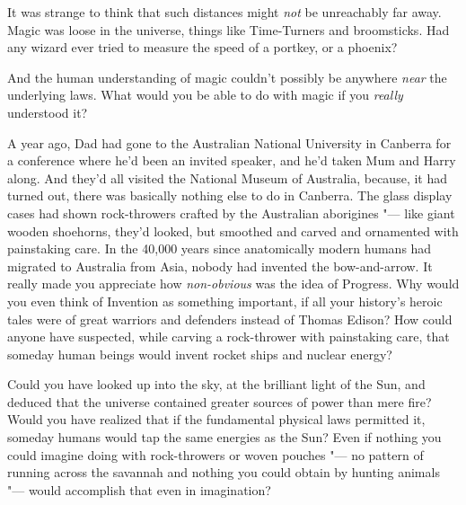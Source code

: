 It was strange to think that such distances might \emph{not} be
unreachably far away. Magic was loose in the universe, things like
Time-Turners and broomsticks. Had any wizard ever tried to measure the
speed of a portkey, or a phoenix?

And the human understanding of magic couldn't possibly be anywhere
\emph{near} the underlying laws. What would you be able to do with magic
if you \emph{really} understood it?

A year ago, Dad had gone to the Australian National University in
Canberra for a conference where he'd been an invited speaker, and he'd
taken Mum and Harry along. And they'd all visited the National Museum of
Australia, because, it had turned out, there was basically nothing else
to do in Canberra. The glass display cases had shown rock-throwers
crafted by the Australian aborigines "--- like giant wooden shoehorns,
they'd looked, but smoothed and carved and ornamented with painstaking
care. In the 40,000 years since anatomically modern humans had migrated
to Australia from Asia, nobody had invented the bow-and-arrow. It really
made you appreciate how \emph{non-obvious} was the idea of Progress. Why
would you even think of Invention as something important, if all your
history's heroic tales were of great warriors and defenders instead of
Thomas Edison? How could anyone have suspected, while carving a
rock-thrower with painstaking care, that someday human beings would
invent rocket ships and nuclear energy?

Could you have looked up into the sky, at the brilliant light of the
Sun, and deduced that the universe contained greater sources of power
than mere fire? Would you have realized that if the fundamental physical
laws permitted it, someday humans would tap the same energies as the
Sun? Even if nothing you could imagine doing with rock-throwers or woven
pouches "--- no pattern of running across the savannah and nothing you
could obtain by hunting animals "--- would accomplish that even in
imagination?

